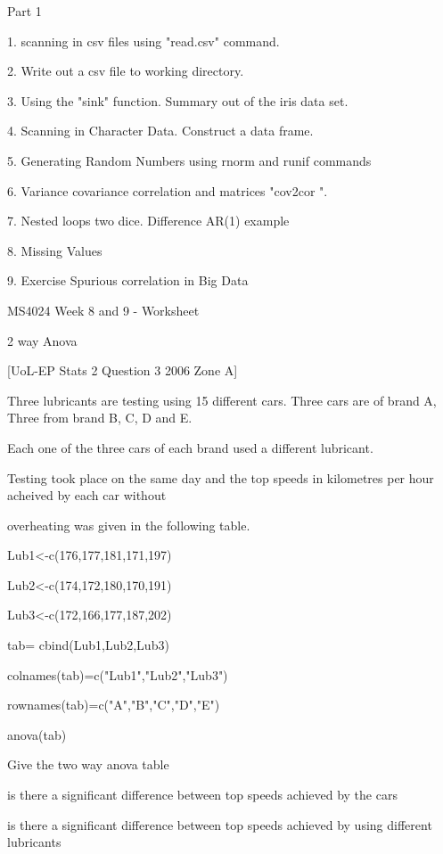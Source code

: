 
Part 1


1. scanning in csv files using "read.csv" command.

2. Write out a csv file to working directory.

3. Using the "sink" function. Summary out of the iris data set.

4. Scanning in Character Data. Construct a data frame.

5. Generating Random Numbers using rnorm and runif commands

6. Variance covariance correlation and matrices "cov2cor ".

7. Nested loops two dice. Difference AR(1) example

8. Missing Values

 9. Exercise Spurious correlation in Big Data



MS4024 Week 8 and 9 - Worksheet

2 way Anova


[UoL-EP Stats 2 Question 3 2006 Zone A]


Three lubricants are testing using 15 different cars. Three cars are of brand A, Three from brand B, C, D and E.


Each one of the three cars of each brand used a different lubricant.


Testing took place on the same day and the top speeds in kilometres per hour acheived by each car without

overheating was given in the following table.


Lub1<-c(176,177,181,171,197)

Lub2<-c(174,172,180,170,191)

Lub3<-c(172,166,177,187,202)


tab= cbind(Lub1,Lub2,Lub3)

colnames(tab)=c("Lub1","Lub2","Lub3")

rownames(tab)=c("A","B","C","D","E")


anova(tab)


Give the two way anova table

is there a significant difference between top speeds achieved by the cars

is there a significant difference between top speeds achieved by using different lubricants


